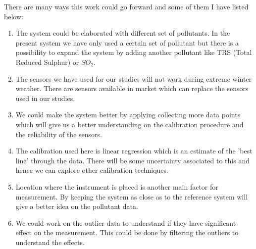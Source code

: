 There are many ways this work could go forward and some of them I have listed below:
\begin{enumerate}
    \item The system could be elaborated with different set of pollutants. In the present system we have only used a certain set of pollutant but there is a possibility to expand the system by adding another pollutant like TRS (Total Reduced Sulphur) or $SO_{2}$.
    
    
    \item The sensors we have used for our studies will not work during extreme winter weather. There are sensors available in market which can replace the sensors used in our studies. 
     
    \item We could make the system better by applying collecting more data points which will give us a better understanding on the calibration procedure and the reliability of the sensors.
    
    \item The calibration used here is linear regression which is an estimate of the 'best line' through the data. There will be some uncertainty associated to this and hence we can explore other calibration techniques.
    
    \item Location where the instrument is placed is another main factor for measurement. By keeping the system as close as to the reference system will give a better idea on the pollutant data.
    
    \item We could work on the outlier data to understand if they have significant effect on the measurement. This could be done by filtering the outliers to understand the effects. 
    

\end{enumerate}



